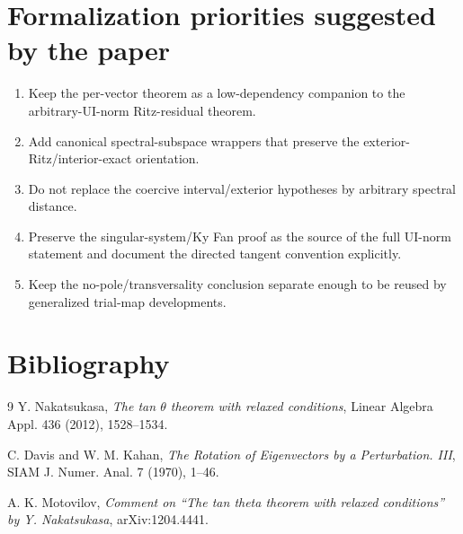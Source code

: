 \section{Formalization priorities suggested by the paper}

\begin{enumerate}[leftmargin=2em]
\item Keep the per-vector theorem as a low-dependency companion to the arbitrary-UI-norm Ritz-residual theorem.
\item Add canonical spectral-subspace wrappers that preserve the exterior-Ritz/interior-exact orientation.
\item Do not replace the coercive interval/exterior hypotheses by arbitrary spectral distance.
\item Preserve the singular-system/Ky Fan proof as the source of the full UI-norm statement and document the directed tangent convention explicitly.
\item Keep the no-pole/transversality conclusion separate enough to be reused by generalized trial-map developments.
\end{enumerate}

\section*{Bibliography}
\begin{thebibliography}{9}
Y. Nakatsukasa,
\emph{The tan $\theta$ theorem with relaxed conditions},
Linear Algebra Appl. 436 (2012), 1528--1534.

C. Davis and W. M. Kahan,
\emph{The Rotation of Eigenvectors by a Perturbation. III},
SIAM J. Numer. Anal. 7 (1970), 1--46.

A. K. Motovilov,
\emph{Comment on ``The tan theta theorem with relaxed conditions'' by Y. Nakatsukasa},
arXiv:1204.4441.
\end{thebibliography}


